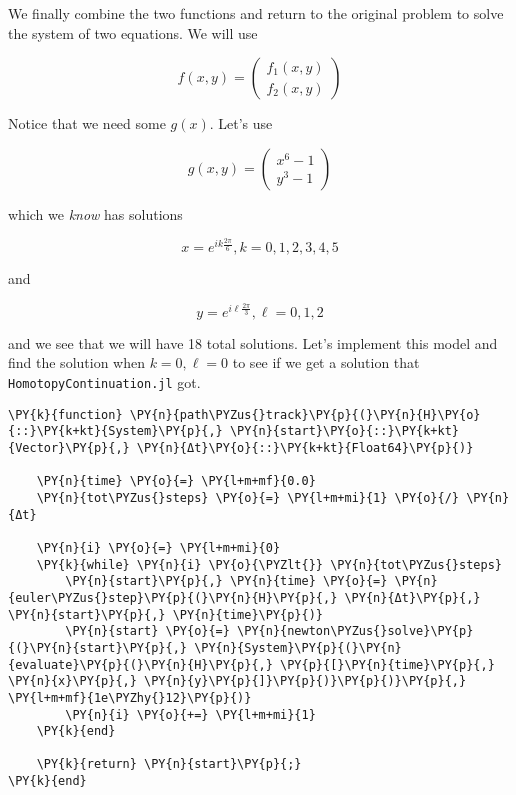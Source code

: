 \documentclass[11pt]{article}
\begin{document}
We finally combine the two functions and return to the original problem
to solve the system of two equations. We will use

\[
f(x, y) = \begin{pmatrix} f_1(x,y) \\ f_2(x, y) \end{pmatrix}
\]

Notice that we need some \(g(x)\). Let's use

\[
g(x, y) = \begin{pmatrix} x^6 - 1 \\ y^3 - 1 \end{pmatrix}
\]

which we \emph{know} has solutions

\[
    x = e^{ik\frac{2\pi}{6}}, k = 0,1,2,3,4,5
\]

and

\[
    y = e^{i\ell\frac{2\pi}{3}}, \ell = 0,1,2
\]

and we see that we will have 18 total solutions. Let's implement this
model and find the solution when \(k = 0, \ell = 0\) to see if we get a
solution that \texttt{HomotopyContinuation.jl} got.

    \begin{tcolorbox}[breakable, size=fbox, boxrule=1pt, pad at break*=1mm,colback=cellbackground, colframe=cellborder]
\begin{Verbatim}[commandchars=\\\{\}]
\PY{k}{function} \PY{n}{path\PYZus{}track}\PY{p}{(}\PY{n}{H}\PY{o}{::}\PY{k+kt}{System}\PY{p}{,} \PY{n}{start}\PY{o}{::}\PY{k+kt}{Vector}\PY{p}{,} \PY{n}{Δt}\PY{o}{::}\PY{k+kt}{Float64}\PY{p}{)}

    \PY{n}{time} \PY{o}{=} \PY{l+m+mf}{0.0}
    \PY{n}{tot\PYZus{}steps} \PY{o}{=} \PY{l+m+mi}{1} \PY{o}{/} \PY{n}{Δt}

    \PY{n}{i} \PY{o}{=} \PY{l+m+mi}{0}
    \PY{k}{while} \PY{n}{i} \PY{o}{\PYZlt{}} \PY{n}{tot\PYZus{}steps}
        \PY{n}{start}\PY{p}{,} \PY{n}{time} \PY{o}{=} \PY{n}{euler\PYZus{}step}\PY{p}{(}\PY{n}{H}\PY{p}{,} \PY{n}{Δt}\PY{p}{,} \PY{n}{start}\PY{p}{,} \PY{n}{time}\PY{p}{)}
        \PY{n}{start} \PY{o}{=} \PY{n}{newton\PYZus{}solve}\PY{p}{(}\PY{n}{start}\PY{p}{,} \PY{n}{System}\PY{p}{(}\PY{n}{evaluate}\PY{p}{(}\PY{n}{H}\PY{p}{,} \PY{p}{[}\PY{n}{time}\PY{p}{,} \PY{n}{x}\PY{p}{,} \PY{n}{y}\PY{p}{]}\PY{p}{)}\PY{p}{)}\PY{p}{,} \PY{l+m+mf}{1e\PYZhy{}12}\PY{p}{)}
        \PY{n}{i} \PY{o}{+=} \PY{l+m+mi}{1}
    \PY{k}{end}

    \PY{k}{return} \PY{n}{start}\PY{p}{;} 
\PY{k}{end}
\end{Verbatim}
\end{tcolorbox}
\end{document}
